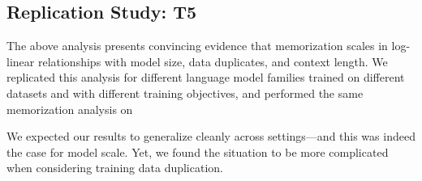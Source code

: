\subsection{Replication Study: T5}

The above analysis presents convincing evidence that memorization scales in log-linear relationships with model size, data duplicates, and context length.
%
We replicated this analysis for different language model families trained on different datasets
and with different training objectives, and performed the same memorization analysis on

%
We expected our results to generalize cleanly across settings---and this was indeed the case for model scale. Yet, we found the situation to be more complicated when considering training data duplication.



